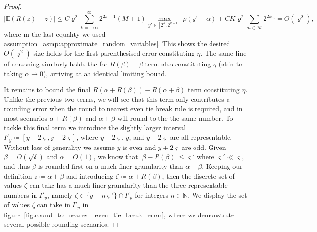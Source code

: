 \documentclass[manuscript,review]{acmart}
\begin{document}
\begin{proof}
\begin{equation*}
\lvert \mathbb{E}(R(z) - z) \rvert  \leq C \varrho^2 \sum_{k=-\infty}^{\infty}   2^{2k+1} (M+1) \max_{y'\in[2^{k}, 2^{k+1}]} \rho(y' - \alpha) 
+ C K \varrho^2 \sum_{m \in \mathcal{M}} 2^{2k_m} = O(\varrho^2), 
\end{equation*}
where in the last equality we used assumption~\ref{asmp:approximate_random_variables}. This shows the desired $ O(\varrho^2) $ size holds for the first parenthesised error constituting $ \eta $. The same line of reasoning similarly holds the for $ R(\beta) - \beta $ term also constituting $ \eta $ (akin to taking $ \alpha \to 0 $), arriving at an identical limiting bound.

It remains to bound the final $ R(\alpha + R(\beta)) - R(\alpha + \beta) $ term constituting $ \eta $. Unlike the previous two terms, we will see that this term only contributes a rounding error when the round to nearest even tie break rule is required, and in most scenarios $ \alpha + R(\beta)$ and $\alpha + \beta $ will round to the the same number. To tackle this final term we introduce the slightly larger interval $ I'_y \coloneqq [y-2\varsigma, y+2\varsigma] $, where $ y-2\varsigma $, $ y $, and $ y + 2\varsigma $ are all representable. Without loss of generality we assume $ y $ is even and $ y \pm 2\varsigma $ are odd. Given $ \beta = O(\sqrt{\delta}) $ and $ \alpha  = O(1) $, we know that $ \lvert \beta - R(\beta)\rvert \leq \varsigma' $ where $ \varsigma' \ll \varsigma $, and thus $ \beta  $ is rounded first on a much finer granularity than $ \alpha + \beta $. Keeping our definition $ z \coloneqq \alpha + \beta $ and introducing $ \zeta \coloneqq \alpha + R(\beta) $, then the discrete set of values $ \zeta $ can take has a much finer granularity than the three representable numbers in $ I'_y $, namely $ \zeta \in \{y \pm n \varsigma'\} \cap I'_y$ for integers $ n \in \mathbb{N} $. We display the set of values $ \zeta $ can take in $ I'_y $ in figure~\ref{fig:round_to_nearest_even_tie_break_error}, where we demonstrate several possible rounding scenarios. 


\end{proof}
\end{document}
